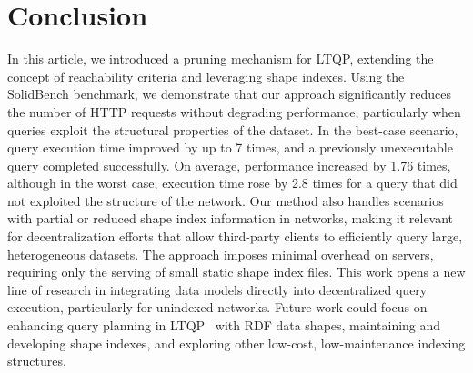 \section{Conclusion}\label{sec:conclusion}

In this article, we introduced a pruning mechanism for LTQP, extending the concept of reachability criteria and leveraging shape indexes. 
Using the SolidBench benchmark, we demonstrate that our approach significantly reduces the number of HTTP requests without degrading performance, particularly when queries exploit the structural properties of the dataset.
In the best-case scenario, query execution time improved by up to 7 times, and a previously unexecutable query completed successfully.
On average, performance increased by 1.76 times, although in the worst case, execution time rose by 2.8 times for a query that did not exploited the structure of the network. 
Our method also handles scenarios with partial or reduced shape index information in networks, making it relevant for decentralization efforts that allow third-party clients to efficiently query large, heterogeneous datasets.
The approach imposes minimal overhead on servers, requiring only the serving of small static shape index files. 
This work opens a new line of research in integrating data models directly into decentralized query execution, particularly for unindexed networks.
Future work could focus on enhancing query planning in LTQP~\cite{taelman2024towards} with RDF data shapes, maintaining and developing shape indexes, and exploring other low-cost, low-maintenance indexing structures.


